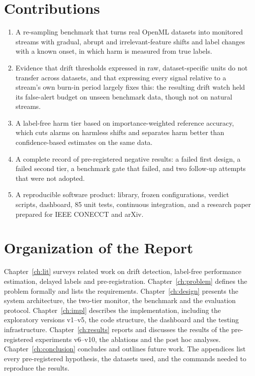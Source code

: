 \section{Contributions}
\begin{enumerate}
\item A re-sampling benchmark that turns real OpenML datasets into monitored streams with gradual, abrupt and irrelevant-feature shifts and label changes with a known onset, in which harm is measured from true labels.
\item Evidence that drift thresholds expressed in raw, dataset-specific units do not transfer across datasets, and that expressing every signal relative to a stream's own burn-in period largely fixes this: the resulting drift watch held its false-alert budget on unseen benchmark data, though not on natural streams.
\item A label-free harm tier based on importance-weighted reference accuracy, which cuts alarms on harmless shifts and separates harm better than confidence-based estimates on the same data.
\item A complete record of pre-registered negative results: a failed first design, a failed second tier, a benchmark gate that failed, and two follow-up attempts that were not adopted.
\item A reproducible software product: library, frozen configurations, verdict scripts, dashboard, 85 unit tests, continuous integration, and a research paper prepared for IEEE CONECCT and arXiv.
\end{enumerate}

\section{Organization of the Report}
Chapter~\ref{ch:lit} surveys related work on drift detection, label-free performance estimation, delayed labels and pre-registration. Chapter~\ref{ch:problem} defines the problem formally and lists the requirements. Chapter~\ref{ch:design} presents the system architecture, the two-tier monitor, the benchmark and the evaluation protocol. Chapter~\ref{ch:impl} describes the implementation, including the exploratory versions v1--v5, the code structure, the dashboard and the testing infrastructure. Chapter~\ref{ch:results} reports and discusses the results of the pre-registered experiments v6--v10, the ablations and the post hoc analyses. Chapter~\ref{ch:conclusion} concludes and outlines future work. The appendices list every pre-registered hypothesis, the datasets used, and the commands needed to reproduce the results.
